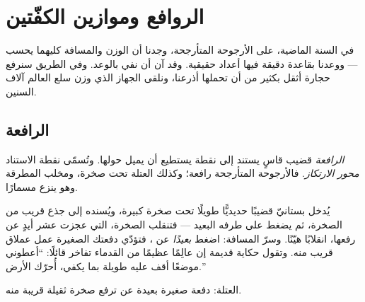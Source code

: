 \chapter{الروافع وموازين الكفّتين}\label{ch:g3:levers-and-scales}

في السنة الماضية، على الأرجوحة المتأرجحة، وجدنا أن الوزن والمسافة
كليهما يحسب --- ووعدنا بقاعدة دقيقة فيها أعداد حقيقية. وقد آن أن
نفي بالوعد. وفي الطريق سنرفع حجارة أثقل بكثير من أن تحملها
أذرعنا، ونلقى الجهاز الذي وزن سلع العالم آلاف السنين.

\section{الرافعة}

\begin{definition}\label{def:g3:levers-and-scales:lever}
\emph{الرافعة} قضيب قاسٍ يستند إلى نقطة يستطيع أن
يميل حولها. وتُسمّى نقطة الاستناد \emph{محور
الارتكاز}. فالأرجوحة المتأرجحة رافعة؛ وكذلك
العتلة تحت صخرة، ومخلب المطرقة وهو ينزع مسمارًا.
\end{definition}

\begin{example}\label{ex:g3:levers-and-scales:crowbar}
يُدخل بستانيّ قضيبًا حديديًّا طويلًا تحت صخرة كبيرة، ويُسنده إلى
جذع قريب من الصخرة، ثم يضغط على طرفه البعيد --- فتنقلب الصخرة،
التي عجزت عشر أيدٍ عن رفعها، انقلابًا هيّنًا. وسرّ 
المسافة: اضغط \emph{بعيدًا} عن ، فتؤدّي دفعتك
الصغيرة عمل عملاق قريب منه. وتقول حكاية قديمة إن عالِمًا عظيمًا من
القدماء تفاخر قائلًا: ``أعطوني موضعًا أقف عليه  طويلة
بما يكفي، أُحرّك الأرض.''
\end{example}

\begin{omfigure}

{\small العتلة: دفعة صغيرة بعيدة عن  ترفع صخرة
ثقيلة قريبة منه.}
\end{omfigure}

